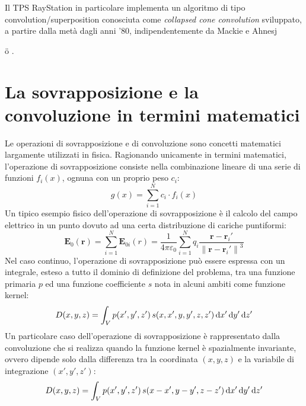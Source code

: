 Il TPS RayStation in particolare implementa un algoritmo di tipo convolution/superposition conosciuta come \textit{collapsed cone convolution} sviluppato, a partire dalla metà dagli anni '80, indipendentemente da Mackie e Ahnesj{\"{o} \cite{Ahnesjo1989, Boyer1998, Mackie1985, Ahnesjo1987}.



\section{La sovrapposizione e la convoluzione in termini matematici}
Le operazioni di sovrapposizione e di convoluzione sono concetti matematici largamente utilizzati in fisica. Ragionando unicamente in termini matematici, l'operazione di sovrapposizione consiste nella combinazione lineare di una serie di funzioni $f_i(x)$, ognuna con un proprio peso $c_i$:
\begin{equation}
g(x) = \sum_{i=1}^{N} c_i\cdot f_i(x)
\end{equation}
Un tipico esempio fisico dell'operazione di sovrapposizione è il calcolo del campo elettrico in un punto dovuto ad una certa distribuzione di cariche puntiformi:
\begin{equation}
\mathbf E_0(\mathbf r) = \sum_{i=1}^N \mathbf E_{0i}(r) = \frac {1}{4 \pi \varepsilon_0} \sum_{i=1}^N q_i \frac {\mathbf r - \mathbf r_i'} {\left \| \mathbf r - \mathbf r_i' \right \|^3}
\end{equation}
Nel caso continuo, l'operazione di sovrapposizione può essere espressa con un integrale, esteso a tutto il dominio di definizione del problema, tra una funzione primaria $p$ ed una funzione coefficiente $s$ nota in alcuni ambiti come funzione kernel:
\begin{equation}
\label{eq:sovrapp_math}
D(x,y,z) = \int_V p(x',y',z')\, s(x,x',y,y',z,z')\,\text{d} x' \,\text{d} y' \,\text{d} z'
\end{equation}
Un particolare caso dell'operazione di sovrapposizione è rappresentato dalla convoluzione che si realizza quando la funzione kernel è spazialmente invariante, ovvero dipende solo dalla differenza tra la coordinata $(x,y,z)$ e la variabile di integrazione $(x',y',z')$:
\begin{equation}
\label{eq:convol_math}
D(x,y,z) = \int_V p(x',y',z')\, s(x-x',y-y',z-z')\,\text{d} x' \,\text{d} y' \,\text{d} z'
\end{equation}


}
